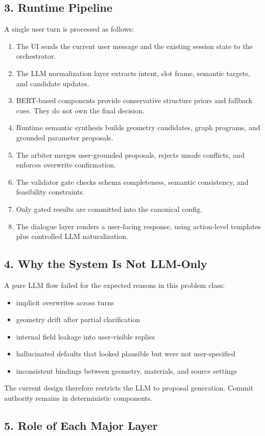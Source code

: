 \documentclass[11pt,a4paper]{ctexart}
\begin{document}
\subsection*{3. Runtime Pipeline}
A single user turn is processed as follows:
\begin{enumerate}
\item The UI sends the current user message and the existing session state to the orchestrator.
\item The LLM normalization layer extracts intent, slot frame, semantic targets, and candidate updates.
\item BERT-based components provide conservative structure priors and fallback cues. They do not own the final decision.
\item Runtime semantic synthesis builds geometry candidates, graph programs, and grounded parameter proposals.
\item The arbiter merges user-grounded proposals, rejects unsafe conflicts, and enforces overwrite confirmation.
\item The validator gate checks schema completeness, semantic consistency, and feasibility constraints.
\item Only gated results are committed into the canonical config.
\item The dialogue layer renders a user-facing response, using action-level templates plus controlled LLM naturalization.
\end{enumerate}
\subsection*{4. Why the System Is Not LLM-Only}
A pure LLM flow failed for the expected reasons in this problem class:
\begin{itemize}
\item implicit overwrites across turns
\item geometry drift after partial clarification
\item internal field leakage into user-visible replies
\item hallucinated defaults that looked plausible but were not user-specified
\item inconsistent bindings between geometry, materials, and source settings
\end{itemize}
The current design therefore restricts the LLM to proposal generation. Commit authority remains in deterministic components.
\subsection*{5. Role of Each Major Layer}
\end{document}

